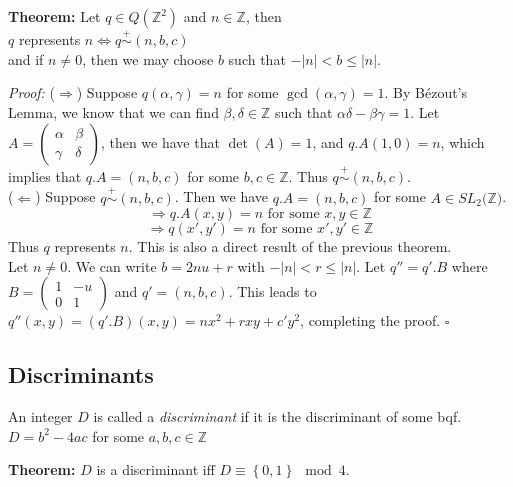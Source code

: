 \documentclass[a4paper,11pt,abstracton]{scrartcl}
\theoremstyle{dotlessP}
\theoremstyle{dotlessS}
\theoremstyle{remark}
\theoremstyle{definition}
\begin{document}
\begin{problem_box}
\textbf{Theorem:}
Let $q \in Q(\mathbb{Z}^2)$ and $n \in \mathbb{Z}$, then 
\\ $q$ represents $n \iff q \overset{+}{\sim} (n,b,c)$ 
\\ and if $n \neq 0$, then we may choose $b$ such that  $-|n| < b \leq |n|$.
\end{problem_box}

\begin{claim_box}
\textit{Proof:} ($\Rightarrow$)
Suppose $q(\alpha,\gamma)=n$ for some $\gcd(\alpha,\gamma)=1$. By Bézout's Lemma, we know that we can find $\beta, \delta \in \mathbb{Z}$ such that $\alpha \delta - \beta \gamma = 1$. Let $A = \begin{pmatrix}
\alpha &\beta \\
\gamma &\delta
\end{pmatrix}$, then we have that $\det(A)=1$, and $q.A(1,0)=n$, which implies that $q.A=(n,b,c)$ for some $b,c \in \mathbb{Z}$. Thus $q \overset{+}{\sim} (n,b,c)$.
\\ ($\Leftarrow$)
Suppose $q \overset{+}{\sim} (n,b,c)$. Then we have $q.A=(n,b,c)$ for some $A \in SL_2(\mathbb{Z)}$. 
$$\Rightarrow q.A(x,y)=n \text{ for some } x,y \in \mathbb{Z}$$
$$\Rightarrow q(x',y')=n \text{ for some } x',y' \in \mathbb{Z}$$
Thus $q$ represents $n$. This is also a direct result of the previous theorem.
\\ Let $n \neq 0$. We can write $b = 2nu + r$ with $-|n| < r \leq |n|$. Let $q'' = q'.B$ where $B = \begin{pmatrix}
1 &-u \\
0 &1
\end{pmatrix}$ and $q'=(n,b,c)$. This leads to $q''(x,y) = (q'.B)(x,y) =
nx^2 +rxy +c'y^2$, completing the proof.
\hfill$\square$
\end{claim_box}

\subsection{Discriminants}
\begin{definition_box}
An integer $D$ is called a \emph{discriminant} if it is the discriminant of some bqf.
\\ $D=b^2-4ac$ for some $a, b, c \in \mathbb{Z}$
\end{definition_box}

\begin{problem_box}
\textbf{Theorem:}
$D$ is a discriminant iff $D \equiv \left\{0,1\right\} \mod{4}$.
\end{problem_box}
\end{document}
